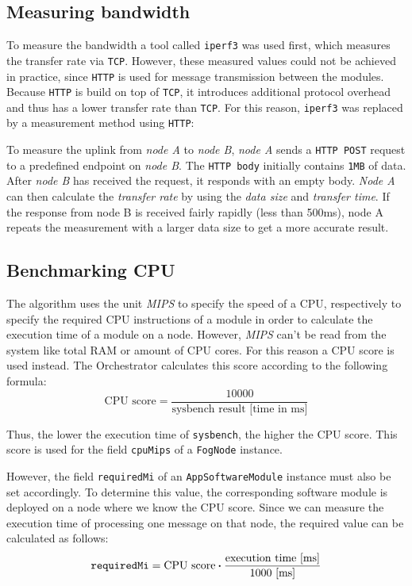 \subsection{Measuring bandwidth\label{sec:measuring-bandwidth}}
To measure the bandwidth a tool called \texttt{iperf3} was used first, which measures the transfer rate via \texttt{TCP}. However, these measured values could not be achieved in practice, since \texttt{HTTP} is used for message transmission between the modules. Because \texttt{HTTP} is build on top of \texttt{TCP}, it introduces additional protocol overhead and thus has a lower transfer rate than \texttt{TCP}. For this reason, \texttt{iperf3} was replaced by a measurement method using \texttt{HTTP}:

To measure the uplink from \textit{node A} to \textit{node B}, \textit{node A} sends a \texttt{HTTP POST} request to a predefined endpoint on \textit{node B}. The \texttt{HTTP body} initially contains \texttt{1MB} of data. After \textit{node B} has received the request, it responds with an empty body. \textit{Node A} can then calculate the \textit{transfer rate} by using the \textit{data size} and \textit{transfer time}.
If the response from node B is received fairly rapidly (less than 500ms), node A repeats the measurement with a larger data size to get a more accurate result.

\subsection{Benchmarking CPU\label{sec:benchmark-cpu}}
The algorithm uses the unit \textit{MIPS} to specify the speed of a CPU, respectively to specify the required CPU instructions of a module in order to calculate the execution time of a module on a node. However, \textit{MIPS} can't be read from the system like total RAM or amount of CPU cores. For this reason a CPU score is used instead. The Orchestrator calculates this score according to the following formula:
\[\textrm{CPU score} = \frac{10000}{\textrm{sysbench result [time in ms]}}\]

Thus, the lower the execution time of \texttt{sysbench}, the higher the CPU score. This score is used for the field \texttt{cpuMips} of a \texttt{FogNode} instance.

However, the field \texttt{requiredMi} of an \texttt{AppSoftwareModule} instance must also be set accordingly. To determine this value, the corresponding software module is deployed on a node where we know the CPU score. Since we can measure the execution time of processing one message on that node, the required value can be calculated as follows:
\[\textrm{\texttt{requiredMi}} = \textrm{CPU score} \boldsymbol{\cdot} \frac{\textrm{execution time [ms]}}{1000 \textrm{ [ms]}}\]


